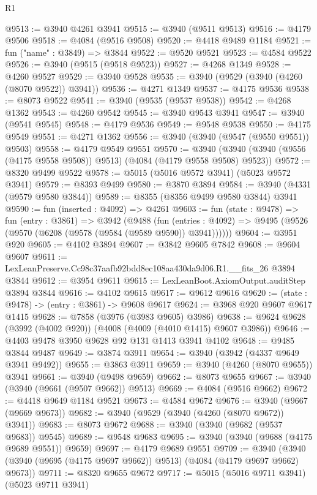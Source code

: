 \begin{lexlean}{R1}
\begin{coremodule}
@9513 := @3940 @4261 @3941
@9515 := @3940 (@9511 @9513)
@9516 := @4179 @9506
@9518 := @4084 (@9516 @9508)
@9520 := @4418 @9489 @1184
@9521 := fun ("name" : @3849) => @3844
@9522 := @9520 @9521
@9523 := @4584 @9522
@9526 := @3940 (@9515 (@9518 @9523))
@9527 := @4268 @1349
@9528 := @4260 @9527
@9529 := @3940 @9528
@9535 := @3940 (@9529 (@3940 (@4260 (@8070 @9522)) @3941))
@9536 := @4271 @1349
@9537 := @4175 @9536
@9538 := @8073 @9522
@9541 := @3940 (@9535 (@9537 @9538))
@9542 := @4268 @1362
@9543 := @4260 @9542
@9545 := @3940 @9543 @3941
@9547 := @3940 (@9541 @9545)
@9548 := @4179 @9536
@9549 := @9548 @9538
@9550 := @4175 @9549
@9551 := @4271 @1362
@9556 := @3940 (@3940 (@9547 (@9550 @9551)) @9503)
@9558 := @4179 @9549 @9551
@9570 := @3940 (@3940 (@3940 (@9556 (@4175 @9558 @9508)) @9513) (@4084 (@4179 @9558 @9508) @9523))
@9572 := @8320 @9499 @9522
@9578 := @5015 (@5016 @9572 @3941) (@5023 @9572 @3941)
@9579 := @8393 @9499
@9580 := @3870 @3894
@9584 := @3940 (@4331 (@9579 @9580 @3844))
@9589 := @8355 (@8356 @9499 @9580 @3844) @3941
@9590 := fun (inserted : @4092) => @4261
@9603 := fun (state : @9478) =>
  fun (entry : @3861) =>
  @3942
    (@9488
      (fun (entries : @4092) => @9495 (@9526 (@9570 (@6208 (@9578 (@9584 (@9589 @9590)) @3941))))))
@9604 := @3951 @920
@9605 := @4102 @3894
@9607 := @3842 @9605 @7842
@9608 := @9604 @9607
@9611 := LexLeanPreserve.Cc98c37aafb92bdd8ec108aa430da9d06.R1.__fits_26 @3894 @3844
@9612 := @3954 @9611
@9615 := LexLeanBoot.AxiomOutput.auditStep @3894 @3844
@9616 := @4102 @9615
@9617 := @9612 @9616
@9620 := (state : @9478) -> (entry : @3861) -> @9608 @9617
@9624 := @3968 @920 @9607 @9617 @1415
@9628 := @7858 (@3976 (@3983 @9605) @3986)
@9638 := @9624 @9628 (@3992 (@4002 @920)) (@4008 (@4009 (@4010 @1415) @9607 @3986))
@9646 := @4403 @9478 @3950 @9628 @92 @131 @1413 @3941 @4102
@9648 := @9485 @3844 @9487
@9649 := @3874 @3911
@9654 := @3940 (@3942 (@4337 @9649 @3941 @9492))
@9655 := @3863 @3911
@9659 := @3940 (@4260 (@8070 @9655)) @3941
@9661 := @3940 (@9498 @9659)
@9662 := @8073 @9655
@9667 := @3940 (@3940 (@9661 (@9507 @9662)) @9513)
@9669 := @4084 (@9516 @9662)
@9672 := @4418 @9649 @1184 @9521
@9673 := @4584 @9672
@9676 := @3940 (@9667 (@9669 @9673))
@9682 := @3940 (@9529 (@3940 (@4260 (@8070 @9672)) @3941))
@9683 := @8073 @9672
@9688 := @3940 (@3940 (@9682 (@9537 @9683)) @9545)
@9689 := @9548 @9683
@9695 := @3940 (@3940 (@9688 (@4175 @9689 @9551)) @9659)
@9697 := @4179 @9689 @9551
@9709 := @3940 (@3940 (@3940 (@9695 (@4175 @9697 @9662)) @9513) (@4084 (@4179 @9697 @9662) @9673))
@9711 := @8320 @9655 @9672
@9717 := @5015 (@5016 @9711 @3941) (@5023 @9711 @3941)

\end{coremodule}
\end{lexlean}
